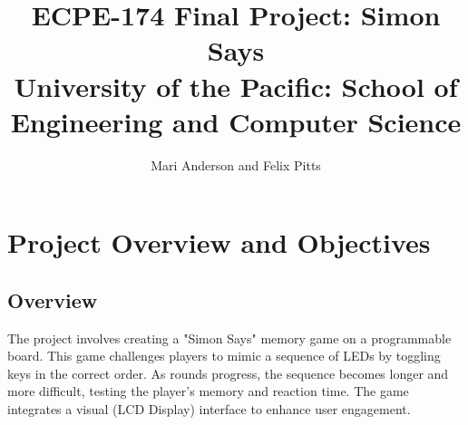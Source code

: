 \documentclass{report}
\begin{document}
\begin{titlepage}
    \title{ECPE-174 Final Project: Simon Says \\ \large{University of the Pacific: School of Engineering and Computer Science}}
    \author{Mari Anderson and Felix Pitts}
    \maketitle
\end{titlepage}
\tableofcontents
\newpage
\chapter{Project Overview and Objectives}
\section{Overview}
The project involves creating a "Simon Says" memory game on a programmable board. This game challenges players to mimic a sequence of LEDs by toggling keys in the correct order. As rounds progress, the sequence becomes longer and more difficult, testing the player's memory and reaction time. The game integrates a visual (LCD Display) interface to enhance user engagement.
\end{document}
